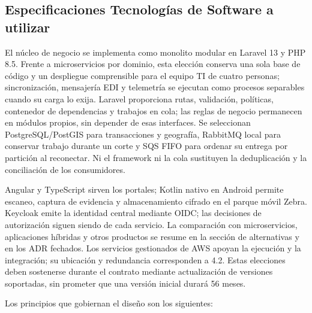 \subsection{Especificaciones Tecnologías de Software a utilizar}
\label{subsec:tecnologias-software}

El núcleo de negocio se implementa como monolito modular en Laravel 13 y PHP 8.5. Frente a microservicios por dominio, esta elección conserva una sola base de código y un despliegue comprensible para el equipo TI de cuatro personas; sincronización, mensajería EDI y telemetría se ejecutan como procesos separables cuando su carga lo exija. Laravel proporciona rutas, validación, políticas, contenedor de dependencias y trabajos en cola; las reglas de negocio permanecen en módulos propios, sin depender de esas interfaces. Se seleccionan PostgreSQL/PostGIS para transacciones y geografía, RabbitMQ local para conservar trabajo durante un corte y SQS FIFO para ordenar su entrega por partición al reconectar. Ni el framework ni la cola sustituyen la deduplicación y la conciliación de los consumidores.

Angular y TypeScript sirven los portales; Kotlin nativo en Android permite escaneo, captura de evidencia y almacenamiento cifrado en el parque móvil Zebra. Keycloak emite la identidad central mediante OIDC; las decisiones de autorización siguen siendo de cada servicio. La comparación con microservicios, aplicaciones híbridas y otros productos se resume en la sección de alternativas y en los ADR fechados. Los servicios gestionados de AWS apoyan la ejecución y la integración; su ubicación y redundancia corresponden a 4.2. Estas elecciones deben sostenerse durante el contrato mediante actualización de versiones soportadas, sin prometer que una versión inicial durará 56 meses.

Los principios que gobiernan el diseño son los siguientes:

